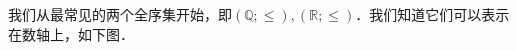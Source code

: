 
\begin{issues}
\issueDraft
\issueTODO
\end{issues}

我们从最常见的两个全序集开始，即$(\mathbb{Q};\leq),(\mathbb{R};\leq)$．我们知道它们可以表示在数轴上，如下图．



